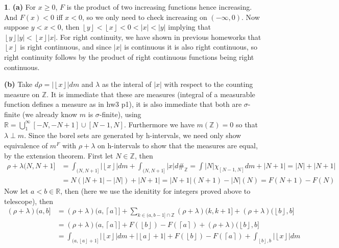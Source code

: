 \documentclass[10.5pt]{article}
\theoremstyle{definition}
\newtheorem{pb}{}
\newcommand{\abs}[1]{\left\vert#1\right\vert}
\newcommand{\floor}[1]{\left\lfloor #1 \right\rfloor}
\newcommand{\ceil}[1]{\left\lceil #1 \right\rceil}
\begin{document}
    \begin{pb}
        \textbf{(a)} For \(x \geq 0\), \(F\) is the product of two increasing functions hence increasing. And \(F(x) < 0\) iff \(x < 0\), so we only need to check increasing on \((-\infty,0)\).
        Now suppose \(y < x < 0\), then \(\floor{y} < \floor{x} < 0 < \abs{x} < \abs{y}\) implying that \(\floor{y}\abs{y} < \floor{x}\abs{x}\). For right continuity, we have shown in previous homeworks
        that \(\floor{x}\) is right continuous, and since \(\abs{x}\) is continuous it is also right continuous, so right continuity follows by the product of right continuous functions being right continuous.

        \textbf{(b)} Take \(d\rho = \abs{\floor{x}} dm\) and \(\lambda\) as the interal of \(\abs{x}\) with respect to the counting measure on \(\mathbb{Z}\).
        It is immediate that these are measures (integral of a measurable function defines a measure as in hw3 p1), it is also immediate that both are \(\sigma\)-finite (we already know \(m\) is \(\sigma\)-finite), 
        using \(\mathbb{R} = \bigcup_1^\infty [-N,-N+1]\cup[N-1,N]\).  Furthermore we have \(m(\mathbb{Z}) = 0\) so that \(\lambda \perp m\). 
        Since the borel sets are generated by h-intervals, we need only show equivalence of \(m^F\) with \(\rho + \lambda\) on h-intervals to show that the measures are equal, by the extension theorem.
        First let \(N \in \mathbb{Z}\), then
        \begin{align*}
            \rho+\lambda(N,N+1] &= \int_{(N,N+1]} \abs{\floor{x}} dm +\int_{(N,N+1]} \abs{x} d\#_\mathbb{Z} = \int \abs{N} \chi_{[N-1,N]} dm + \abs{N+1} = \abs{N} + \abs{N+1} \\
            &= N(\abs{N+1}-\abs{N}) + \abs{N+1} = \abs{N+1}(N+1) - \abs{N}(N) = F(N+1) - F(N)
        \end{align*}
        Now let \(a<b \in \mathbb{R}\), then (here we use the idenitity for integers proved above to telescope), then
        \begin{align*}
            (\rho+\lambda)(a,b] &= (\rho+\lambda)(a,\ceil{a}] + \sum_{k \in (a,b-1]\cap \mathbb{Z}} (\rho+\lambda)(k,k+1] + (\rho+\lambda)(\floor{b},b] \\
            &= (\rho+\lambda)(a,\ceil{a}] + F(\floor{b}) - F(\ceil{a}) + (\rho+\lambda)(\floor{b},b] \\
            &= \int_{(a,\floor{a}+1]}\abs{\floor{x}}dm + \abs{\floor{a} + 1} + F(\floor{b}) - F(\ceil{a}) + \int_{\floor{b},b} \abs{\floor{x}} dm\\

\end{align*}
\end{pb}
\end{document}
